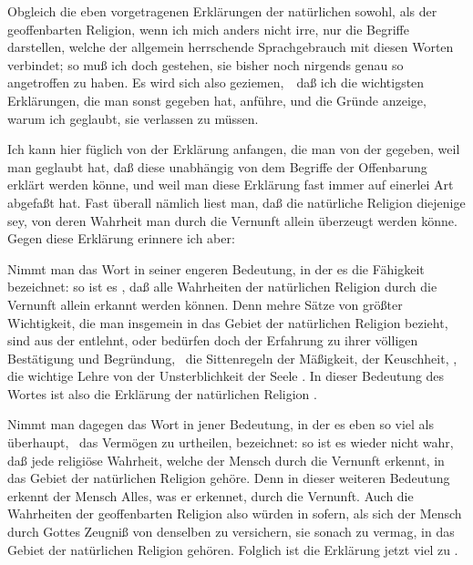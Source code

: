 Obgleich die eben vorgetragenen Erklärungen der natürlichen sowohl, als der geoffenbarten Religion, wenn ich mich anders nicht irre, nur die Begriffe darstellen, welche der allgemein herrschende Sprachgebrauch mit diesen Worten verbindet; so muß ich doch gestehen, sie bisher noch nirgends genau so angetroffen zu haben. Es wird sich also geziemen,~\ daß ich die wichtigsten Erklärungen, die man sonst gegeben hat, anführe, und die Gründe anzeige, warum ich geglaubt, sie verlassen zu müssen.
\begin{aufza} 
\item Ich kann hier füglich von der Erklärung anfangen, die man von der  gegeben, weil man geglaubt hat, daß diese unabhängig von dem Begriffe der Offenbarung erklärt werden könne, und weil man diese Erklärung fast immer auf einerlei Art abgefaßt hat. Fast überall nämlich liest man, daß die natürliche Religion diejenige sey, von deren Wahrheit man durch die Vernunft allein überzeugt werden könne. Gegen diese Erklärung erinnere ich aber:
\begin{aufzb}
\item Nimmt man das Wort  in seiner engeren Bedeutung, in der es die Fähigkeit  bezeichnet: so ist es , daß alle Wahrheiten der natürlichen Religion durch die Vernunft allein erkannt werden können. Denn mehre Sätze von größter Wichtigkeit, die man insgemein in das Gebiet der natürlichen Religion bezieht, sind aus der  entlehnt, oder bedürfen doch der Erfahrung zu ihrer völligen Bestätigung und Begründung, \zB\ die Sittenregeln der Mäßigkeit, der Keuschheit, \usw , die wichtige Lehre von der Unsterblichkeit der Seele \usw. In dieser Bedeutung des Wortes  ist also die Erklärung der natürlichen Religion .
\item Nimmt man dagegen das Wort  in jener  Bedeutung, in der es eben so viel als  überhaupt, \dh\ das Vermögen zu urtheilen, bezeichnet: so ist es wieder nicht wahr, daß jede religiöse Wahrheit, welche der Mensch durch die Vernunft erkennt, in das Gebiet der natürlichen Religion gehöre. Denn in dieser weiteren Bedeutung erkennt der Mensch Alles, was er erkennet, durch die Vernunft. Auch die Wahrheiten der geoffenbarten Religion also würden in sofern, als sich der Mensch durch Gottes Zeugniß von denselben zu versichern, sie sonach zu  vermag, in das Gebiet der natürlichen Religion gehören. Folglich ist die Erklärung jetzt viel zu .~

\end{aufzb}
\end{aufza}
